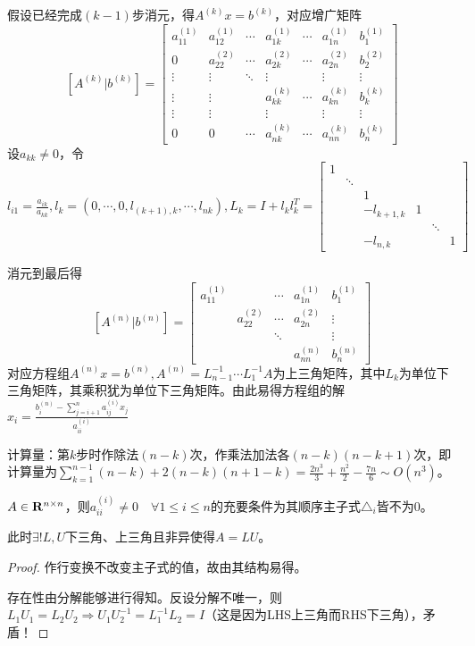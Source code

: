 \documentclass{ctexart}
\begin{document}
假设已经完成$(k-1)$步消元，得$A^{(k)}x=b^{(k)}$，对应增广矩阵\[[A^{(k)}|b^{(k)}]=
\begin{bmatrix}
a_{11}^{(1)}&a_{12}^{(1)}&\cdots&a_{1k}^{(1)}&\cdots&a_{1n}^{(1)}&b_1^{(1)}\\
0&a_{22}^{(2)}&\cdots&a_{2k}^{(2)}&\cdots&a_{2n}^{(2)}&b_2^{(2)}\\
\vdots&\vdots&\ddots&\vdots&&\vdots&\vdots\\
\vdots&\vdots&&a_{kk}^{(k)}&\cdots&a_{kn}^{(k)}&b_k^{(k)}\\
\vdots&\vdots&&\vdots&&\vdots&\vdots\\
0&0&\cdots&a_{nk}^{(k)}&\cdots&a_{nn}^{(k)}&b_n^{(k)}
\end{bmatrix}
\]设$a_{kk}\neq 0$，令$l_{i1}=\frac{a_{ik}}{a_{kk}},l_k=(0,\cdots,0,l_{(k+1),k},\cdots,l_{nk}),L_k=I+l_kl_k^T=
\begin{bmatrix}
1& & & & & \\
 &\ddots& & & & \\
 & &1& & & \\
 & &-l_{k+1,k}&1& & \\
 & & & &\ddots&\\
 & &-l_{n,k}& & &1
\end{bmatrix}
$

消元到最后得
\[[A^{(n)}|b^{(n)}]=
\begin{bmatrix}
a_{11}^{(1)}& &\cdots&a_{1n}^{(1)}&b_1^{(1)}\\
 &a_{22}^{(2)}&\cdots&a_{2n}^{(2)}&\vdots\\
 & &\ddots& &\vdots\\
 & & &a_{nn}^{(n)}&b_n^{(n)}
\end{bmatrix}
\]
对应方程组$A^{(n)}x=b^{(n)},A^{(n)}=L_{n-1}^{-1}\cdots L_1^{-1}A$为上三角矩阵，其中$L_k$为单位下三角矩阵，其乘积犹为单位下三角矩阵。由此易得方程组的解$x_i=\frac{b_i^{(n)}-\sum_{j=i+1}^na_{ij}^{(i)}x_j}{a_{ii}^{(i)}}$

计算量：第$k$步时作除法$(n-k)$次，作乘法加法各$(n-k)(n-k+1)$次，即计算量为$\sum_{k=1}^{n-1}(n-k)+2(n-k)(n+1-k)=\frac{2n^3}{3}+\frac{n^2}{2}-\frac{7n}{6}\sim O(n^3)$。

\begin{Thm}
$A\in \mathbf{R}^{n\times n}$，则$a_{ii}^{(i)}\neq 0\quad\forall 1\leq i\leq n$的充要条件为其顺序主子式$\triangle_i$皆不为$0$。

此时$\exists! L,U$下三角、上三角且非异使得$A=LU$。
\end{Thm}
\begin{proof}
作行变换不改变主子式的值，故由其结构易得。

存在性由分解能够进行得知。反设分解不唯一，则$L_1U_1=L_2U_2\Rightarrow U_1U_2^{-1}=L_1^{-1}L_2=I$（这是因为LHS上三角而RHS下三角），矛盾！
\end{proof}
\end{document}
